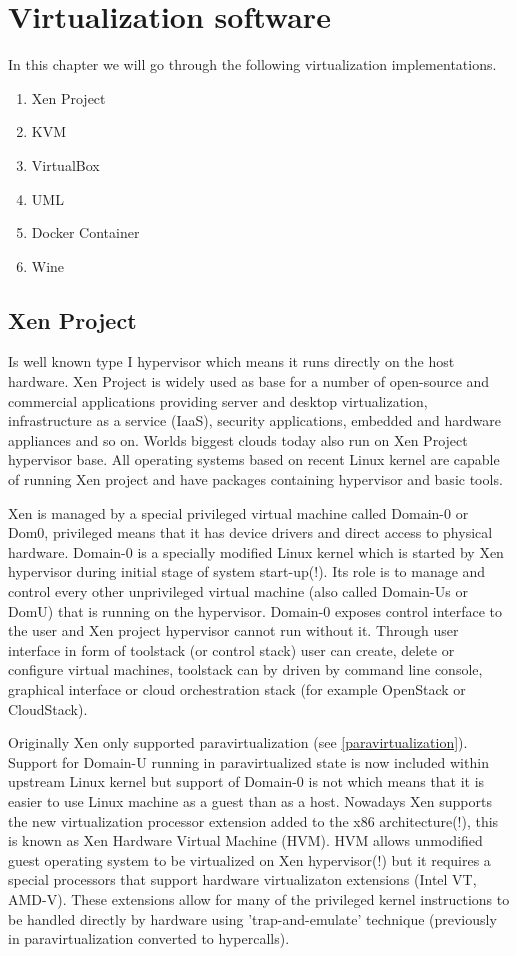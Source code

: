 \chapter{Virtualization software}
In this chapter we will go through the following virtualization implementations.
\begin{enumerate}
\item Xen Project
\item KVM
\item VirtualBox
\item UML
\item Docker Container
\item Wine
\end{enumerate}

\section{Xen Project}
Is well known type I hypervisor which means it runs directly on the host hardware. Xen Project is widely used as base for a number of open-source and commercial applications providing server and desktop virtualization, infrastructure as a service (IaaS), security applications, embedded and hardware appliances and so on. Worlds biggest clouds today also run on Xen Project hypervisor base. All operating systems based on recent Linux kernel are capable of running Xen project and have packages containing hypervisor and basic tools.

Xen is managed by a special privileged virtual machine called Domain-0 or Dom0, privileged means that it has device drivers and direct access to physical hardware. Domain-0 is a specially modified Linux kernel which is started by Xen hypervisor during initial stage of system start-up(!). Its role is to manage and control every other unprivileged virtual machine (also called Domain-Us or DomU) that is running on the hypervisor. Domain-0 exposes control interface to the user and Xen project hypervisor cannot run without it. Through user interface in form of toolstack (or control stack) user can create, delete or configure virtual machines, toolstack can by driven by command line console, graphical interface or cloud orchestration stack (for example OpenStack or CloudStack).

Originally Xen only supported paravirtualization (see \ref{paravirtualization}). Support for Domain-U running in paravirtualized state is now included within upstream Linux kernel but support of Domain-0 is not which means that it is easier to use Linux machine as a guest than as a host. Nowadays Xen supports the new virtualization processor extension added to the x86 architecture(!), this is known as Xen Hardware Virtual Machine (HVM). HVM allows unmodified guest operating system to be virtualized on Xen hypervisor(!) but it requires a special processors that support hardware virtualizaton extensions (Intel VT, AMD-V). These extensions allow for many of the privileged kernel instructions to be handled directly by hardware using 'trap-and-emulate' technique (previously in paravirtualization converted to hypercalls).

